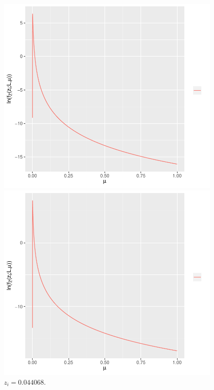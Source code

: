\documentclass[journal,article,submit,moreauthors,pdftex]{Definitions/mdpi}
\begin{document}
\begin{figure}[hbt]
\endminipage\hfill
\centering
\vspace{0.5cm}
  \includegraphics[width=\linewidth]{func_max_ver_L_4_z_70_flev_wishart.pdf}
  	\caption{$z_i=0.00582$.}\label{func_max_ver_L_4_z_70_flev_wishart}
\endminipage\hfill
{}
  \includegraphics[width=\linewidth]{func_max_ver_L_4_z_80_flev_wishart.pdf}
		\caption{$z_i=0.044068$.}\label{func_max_ver__z_80_flev_wishart}
\endminipage\hfill
\end{figure}
\end{document}
